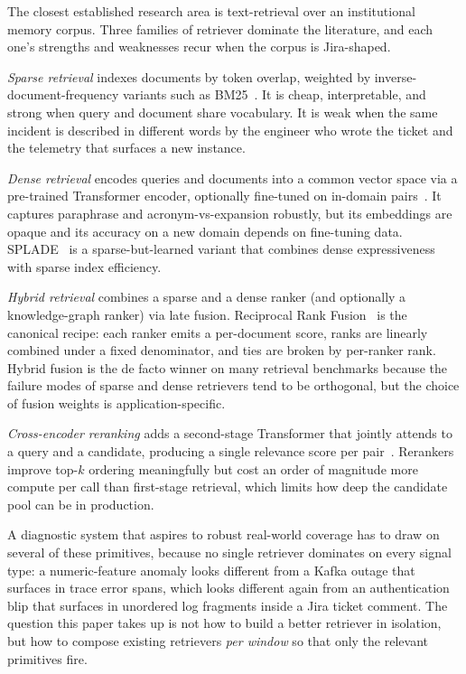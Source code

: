 The closest established research area is text-retrieval over an institutional memory corpus. Three families of retriever dominate the literature, and each one's strengths and weaknesses recur when the corpus is Jira-shaped.

\emph{Sparse retrieval} indexes documents by token overlap, weighted by inverse-document-frequency variants such as BM25~\cite{robertson2009bm25}. It is cheap, interpretable, and strong when query and document share vocabulary. It is weak when the same incident is described in different words by the engineer who wrote the ticket and the telemetry that surfaces a new instance.

\emph{Dense retrieval} encodes queries and documents into a common vector space via a pre-trained Transformer encoder, optionally fine-tuned on in-domain pairs~\cite{reimers2019sbert,karpukhin2020dpr}. It captures paraphrase and acronym-vs-expansion robustly, but its embeddings are opaque and its accuracy on a new domain depends on fine-tuning data. SPLADE~\cite{formal2021splade} is a sparse-but-learned variant that combines dense expressiveness with sparse index efficiency.

\emph{Hybrid retrieval} combines a sparse and a dense ranker (and optionally a knowledge-graph ranker) via late fusion. Reciprocal Rank Fusion~\cite{cormack2009rrf} is the canonical recipe: each ranker emits a per-document score, ranks are linearly combined under a fixed denominator, and ties are broken by per-ranker rank. Hybrid fusion is the de facto winner on many retrieval benchmarks because the failure modes of sparse and dense retrievers tend to be orthogonal, but the choice of fusion weights is application-specific.

\emph{Cross-encoder reranking} adds a second-stage Transformer that jointly attends to a query and a candidate, producing a single relevance score per pair~\cite{nogueira2019rerank}. Rerankers improve top-$k$ ordering meaningfully but cost an order of magnitude more compute per call than first-stage retrieval, which limits how deep the candidate pool can be in production.

A diagnostic system that aspires to robust real-world coverage has to draw on several of these primitives, because no single retriever dominates on every signal type: a numeric-feature anomaly looks different from a Kafka outage that surfaces in trace error spans, which looks different again from an authentication blip that surfaces in unordered log fragments inside a Jira ticket comment. The question this paper takes up is not how to build a better retriever in isolation, but how to compose existing retrievers \emph{per window} so that only the relevant primitives fire.

